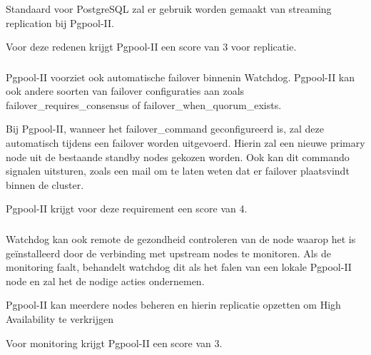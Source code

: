 Standaard voor PostgreSQL zal er gebruik worden gemaakt van streaming replication bij Pgpool-II.

Voor deze redenen krijgt Pgpool-II een score van 3 voor replicatie.

\subsubsection{}
\label{subsubsec:Ondersteuning van failover}

Pgpool-II voorziet ook automatische failover binnenin Watchdog. Pgpool-II kan ook andere soorten van failover configuraties aan zoals failover\_requires\_consensus of \newline failover\_when\_quorum\_exists. 

Bij Pgpool-II, wanneer het failover\_command geconfigureerd is, zal deze automatisch tijdens een failover worden uitgevoerd. Hierin zal een nieuwe primary node uit de bestaande standby nodes gekozen worden. Ook kan dit commando signalen uitsturen, zoals een mail om te laten weten dat er failover plaatsvindt binnen de cluster.

Pgpool-II krijgt voor deze requirement een score van 4.

\subsubsection{}
\label{subsubsec:Ondersteuning van monitoring}

Watchdog kan ook remote de gezondheid controleren van de node waarop het is geïnstalleerd door de verbinding met upstream nodes te monitoren. Als de monitoring faalt, behandelt watchdog dit als het falen van een lokale Pgpool-II node en zal het de nodige acties ondernemen.

Pgpool-II kan meerdere nodes beheren en hierin replicatie opzetten om High Availability te verkrijgen

Voor monitoring krijgt Pgpool-II een score van 3.

\subsection{}
\label{subsec:Should have}


